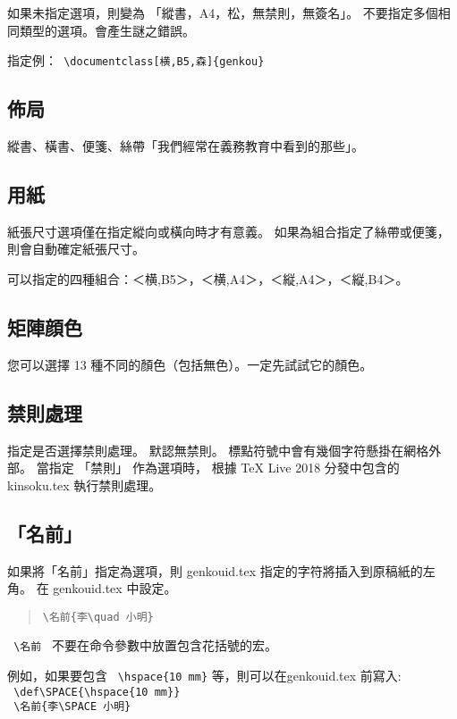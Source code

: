\documentclass[a4,11pt,uplatex,openleft]{jsarticle}
\begin{document}
\par 如果未指定選項，則變為 「縱書，A4，松，無禁則，無簽名」。
不要指定多個相同類型的選項。會產生謎之錯誤。

\par 指定例：\quad \verb+ \documentclass[横,B5,森]{genkou} +



\subsection{佈局}
\par 縱書、橫書、便箋、絲帶「我們經常在義務教育中看到的那些」。

\subsection{用紙}
\par 紙張尺寸選項僅在指定縱向或橫向時才有意義。
如果為組合指定了絲帶或便箋，則會自動確定紙張尺寸。
\par 可以指定的四種組合：＜横,B5＞，＜横,A4＞，＜縦,A4＞，＜縦,B4＞。


\subsection{矩陣顔色}
\par 您可以選擇 13 種不同的顏色（包括無色）。一定先試試它的顏色。

\subsection{禁則處理}
\par 指定是否選擇禁則處理。 默認無禁則。
標點符號中會有幾個字符懸掛在網格外部。 當指定 「禁則」 作為選項時，
根據  \TeX \hspace{3pt} Live 2018  分發中包含的 kinsoku.tex 執行禁則處理。

\subsection{「名前」}
\par 如果將「名前」指定為選項，則 genkouid.tex 指定的字符將插入到原稿紙的左角。
在 genkouid.tex 中設定。

\begin{verse}
\verb+\名前{李\quad 小明}+
\end{verse}
\par  \verb+ \名前 + 不要在命令參數中放置包含花括號的宏。
\par 例如，如果要包含 \verb+ \hspace{10 mm}+ 等，則可以在genkouid.tex 前寫入:\\
\verb+ \def\SPACE{\hspace{10 mm}} +\\
\verb+ \名前{李\SPACE 小明}+
\end{document}
